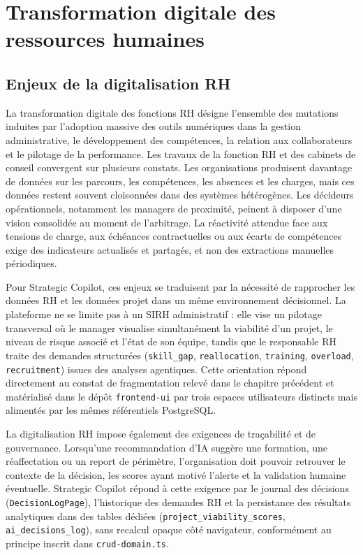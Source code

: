 \section{Transformation digitale des ressources humaines}

\subsection{Enjeux de la digitalisation RH}

La transformation digitale des fonctions RH \cite{strohmeier2020} désigne l'ensemble des mutations induites par l'adoption massive des outils numériques dans la gestion administrative, le développement des compétences, la relation aux collaborateurs et le pilotage de la performance. Les travaux de la fonction RH et des cabinets de conseil convergent sur plusieurs constats. Les organisations produisent davantage de données sur les parcours, les compétences, les absences et les charges, mais ces données restent souvent cloisonnées dans des systèmes hétérogènes. Les décideurs opérationnels, notamment les managers de proximité, peinent à disposer d'une vision consolidée au moment de l'arbitrage. La réactivité attendue face aux tensions de charge, aux échéances contractuelles ou aux écarts de compétences exige des indicateurs actualisés et partagés, et non des extractions manuelles périodiques.

Pour Strategic Copilot, ces enjeux se traduisent par la nécessité de rapprocher les données RH et les données projet dans un même environnement décisionnel. La plateforme ne se limite pas à un SIRH administratif : elle vise un pilotage transversal où le manager visualise simultanément la viabilité d'un projet, le niveau de risque associé et l'état de son équipe, tandis que le responsable RH traite des demandes structurées (\texttt{skill\_gap}, \texttt{reallocation}, \texttt{training}, \texttt{overload}, \texttt{recruitment}) issues des analyses agentiques. Cette orientation répond directement au constat de fragmentation relevé dans le chapitre précédent et matérialisé dans le dépôt \texttt{frontend-ui} par trois espaces utilisateurs distincts mais alimentés par les mêmes référentiels PostgreSQL.

La digitalisation RH impose également des exigences de traçabilité et de gouvernance. Lorsqu'une recommandation d'IA suggère une formation, une réaffectation ou un report de périmètre, l'organisation doit pouvoir retrouver le contexte de la décision, les scores ayant motivé l'alerte et la validation humaine éventuelle. Strategic Copilot répond à cette exigence par le journal des décisions (\texttt{DecisionLogPage}), l'historique des demandes RH et la persistance des résultats analytiques dans des tables dédiées (\texttt{project\_viability\_scores}, \texttt{ai\_decisions\_log}), sans recalcul opaque côté navigateur, conformément au principe inscrit dans \texttt{crud-domain.ts}.


